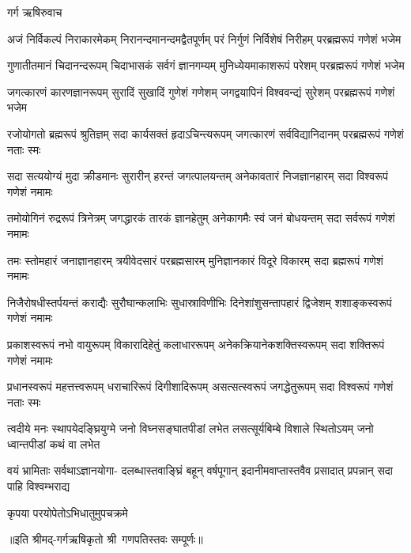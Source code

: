 
गर्ग ऋषिरुवाच

\fourlineindentedshloka
{अजं निर्विकल्पं निराकारमेकम्}
{निरानन्दमानन्दमद्वैतपूर्णम्}
{परं निर्गुणं निर्विशेषं निरीहम्}
{परब्रह्मरूपं गणेशं भजेम}%

\fourlineindentedshloka
{गुणातीतमानं चिदानन्दरूपम्}
{चिदाभासकं सर्वगं ज्ञानगम्यम्}
{मुनिध्येयमाकाशरूपं परेशम्}
{परब्रह्मरूपं गणेशं भजेम}%

\fourlineindentedshloka
{जगत्कारणं कारणज्ञानरूपम्}
{सुरादिं सुखादिं गुणेशं गणेशम्}
{जगद्वयापिनं विश्ववन्द्यं सुरेशम्}
{परब्रह्मरूपं गणेशं भजेम}%

\fourlineindentedshloka
{रजोयोगतो ब्रह्मरूपं श्रुतिज्ञम्}
{सदा कार्यसक्तं हृदाऽचिन्त्यरूपम्}
{जगत्कारणं सर्वविद्यानिदानम्}
{परब्रह्मरूपं गणेशं नताः स्मः}%

\fourlineindentedshloka
{सदा सत्ययोग्यं मुदा क्रीडमानः}
{सुरारीन् हरन्तं जगत्पालयन्तम्}
{अनेकावतारं निजज्ञानहारम्}
{सदा विश्वरूपं गणेशं नमामः}%


\fourlineindentedshloka
{तमोयोगिनं रुद्ररूपं त्रिनेत्रम्}
{जगद्धारकं तारकं ज्ञानहेतुम्}
{अनेकागमैः स्वं जनं बोधयन्तम्}
{सदा सर्वरूपं गणेशं नमामः}%

\fourlineindentedshloka
{तमः स्तोमहारं जनाज्ञानहारम्}
{त्रयीवेदसारं परब्रह्मसारम्}
{मुनिज्ञानकारं विदूरे विकारम्}
{सदा ब्रह्मरूपं गणेशं नमामः}%

\fourlineindentedshloka
{निजैरोषधीस्तर्पयन्तं कराद्यैः}
{सुरौघान्कलाभिः सुधास्राविणीभिः}
{दिनेशांशुसन्तापहारं द्विजेशम्}
{शशाङ्कस्वरूपं गणेशं नमामः}%

\fourlineindentedshloka
{प्रकाशस्वरूपं नभो वायुरूपम्}
{विकारादिहेतुं कलाधाररूपम्}
{अनेकक्रियानेकशक्तिस्वरूपम् }
{सदा शक्तिरूपं गणेशं नमामः}%

\fourlineindentedshloka
{प्रधानस्वरूपं महत्तत्त्वरूपम्}
{धराचारिरूपं दिगीशादिरूपम्}
{असत्सत्स्वरूपं जगद्धेतुरूपम्}
{सदा विश्वरूपं गणेशं नताः स्मः}%

\fourlineindentedshloka
{त्वदीये मनः स्थापयेदङ्घ्रियुग्मे}
{जनो विघ्नसङ्घातपीडां लभेत}
{लसत्सूर्यबिम्बे विशाले स्थितोऽयम्}
{जनो ध्वान्तपीडां कथं वा लभेत}%

\fourlineindentedshloka
{वयं भ्रामिताः सर्वथाऽज्ञानयोगा-}
{दलब्धास्तवाङ्घ्रिं बहून् वर्षपूगान्}
{इदानीमवाप्तास्तवैव प्रसादात्}
{प्रपन्नान् सदा पाहि विश्वम्भराद्य}%

{कृपया परयोपेतोऽभिधातुमुपचक्रमे}%

॥इति श्रीमद्-गर्गऋषिकृतो श्री~गणपतिस्तवः सम्पूर्णः॥